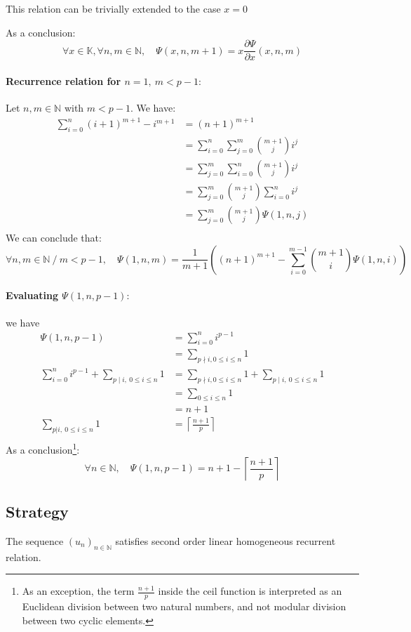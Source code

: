 \documentclass[]{article}
\begin{document}
This relation can be trivially extended to the case $x=0$

As a conclusion:
$$
\boxed{\forall x \in\mathbb{K},\forall n,m\in\mathbb{N},\quad \Psi(x,n,m+1)=x\frac{\partial \Psi}{\partial x}(x,n,m)}
$$


\paragraph{Recurrence relation for $n=1,\ m<p-1: $} Let $n,m\in\mathbb{N}$ with $m<p-1.$ We have:
\begin{align*}
	\sum_{i=0}^{n}(i+1)^{m+1}-i^{m+1}&=(n+1)^{m+1}\\
	&=\sum_{i=0}^{n}\sum_{j=0}^{m} {m+1 \choose j}i^j\\
	&=\sum_{j=0}^{m}\sum_{i=0}^{n} {m+1 \choose j}i^j\\
	&=\sum_{j=0}^{m}{m+1 \choose j}\sum_{i=0}^{n} i^j\\
	&=\sum_{j=0}^m{m+1 \choose j}\Psi(1,n,j)\\
\end{align*}
We can conclude that:
$$
\boxed{\forall n,m\in\mathbb{N}\ /\ m<p-1,\quad\Psi(1,n,m)=\frac{1}{m+1}\left((n+1)^{m+1}-\sum_{i=0}^{m-1}{m+1 \choose i}\Psi(1,n,i)\right)}
$$

\paragraph{Evaluating $\Psi(1,n,p-1): $} we have
\begin{align*}
	\Psi(1,n,p-1)&= \sum_{i=0}^ni^{p-1}\\
	&= \sum_{p \nmid i,0\leq i \leq n} 1\\
	\sum_{i=0}^ni^{p-1}+\sum_{p\mid i, \ 0\leq i\leq n}1
	&=\sum_{p \nmid i,0\leq i \leq n} 1+ \sum_{p\mid i, \ 0\leq i\leq n}1\\
	&=\sum_{0\leq i \leq n} 1 \\
	&=n+1\\
	\sum_{p|i, \ 0\leq i\leq n}1&=\left\lceil\frac{n+1}{p}\right\rceil \\
\end{align*}
 As a conclusion\footnote{As an exception, the term $\frac{n+1}{p}$ inside the ceil function is interpreted as an Euclidean division between two natural numbers, and not modular division between two cyclic elements.}:
 $$
 \boxed{\forall n\in\mathbb{N},\quad \Psi(1,n,p-1) =n+1 -\left\lceil\frac{n+1}{p}\right\rceil}
 $$
 
 \pagebreak
\subsection{Strategy}
The sequence $(u_n)_{n\in\mathbb{N}}$ satisfies second order linear homogeneous recurrent relation.
\end{document}
